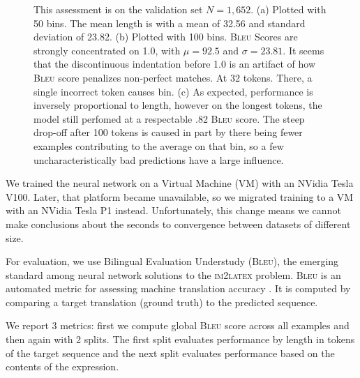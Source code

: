 \documentclass{article}
\newcommand{\BLEU}{\textsc{Bleu}}
\begin{document}
\begin{figure}[h]
\begin{subfigure}{1.0\textwidth}
		\caption{}
	\end{subfigure}
  \caption[Model]{This assessment is on the validation set $N=1,652$. (a)
  Plotted with 50 bins. The mean length is with a mean of  32.56 and standard
  deviation of 23.82. (b) Plotted with 100 bins. \BLEU{} Scores are strongly
  concentrated on 1.0, with $\mu = 92.5$ and $\sigma = 23.81$. It seems that the
  discontinuous indentation before 1.0 is an artifact of how \BLEU{} score
  penalizes non-perfect matches. At 32 tokens. There, a single incorrect token
  causes bin. (c) As expected, performance is inversely proportional to length,
  however on the longest tokens, the model still perfomed at a respectable .82
  \BLEU{} score. The steep drop-off after 100 tokens is caused in part by there
  being fewer examples contributing to the average on that bin, so a few
  uncharacteristically bad predictions have a large influence.} 
\end{figure}

We trained the neural network on a Virtual Machine (VM) with an NVidia Tesla
V100. Later, that platform became unavailable, so we migrated training to a VM
with an NVidia Tesla P1 instead. Unfortunately, this change means we cannot make
conclusions about the seconds to convergence between datasets of different size.

For evaluation, we use Bilingual Evaluation Understudy (\BLEU{}), the emerging
standard among neural network solutions to the \textsc{im2latex} problem. \BLEU{}
is an automated metric for assessing machine translation accuracy
\cite[1]{papineni2002bleu}. It is computed by comparing a target translation
(ground truth) to the predicted sequence.

We report 3 metrics: first we compute global \BLEU{} score across all examples and
then again with 2 splits. The first split evaluates performance by length in
tokens of the target sequence and the next split evaluates performance based on
the contents of the expression.
\end{document}
